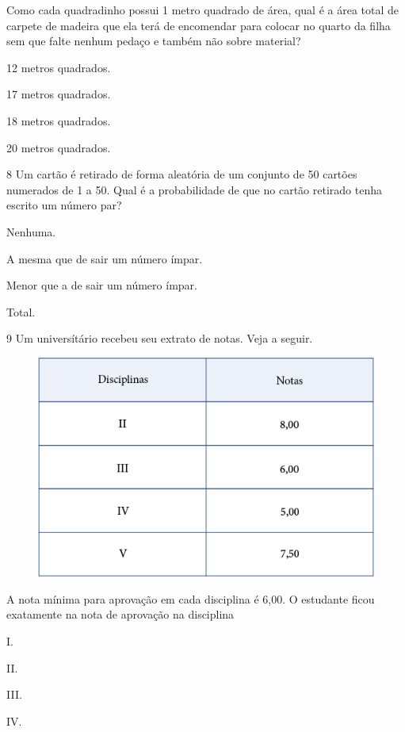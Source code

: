 Como cada quadradinho possui 1 metro quadrado de área, qual é a área total
de carpete de madeira que ela terá de encomendar para colocar no quarto
da filha sem que falte nenhum pedaço e também não sobre material?

\begin{escolha}
\item
  12 metros quadrados.
\item
  17 metros quadrados.
\item
  18 metros quadrados.
\item
  20 metros quadrados.
\end{escolha}


\num{8} Um cartão é retirado de forma aleatória de um conjunto de 50 cartões
numerados de 1 a 50. Qual é a probabilidade de que no cartão retirado
tenha escrito um número par?

\begin{escolha}
\item
  Nenhuma.
\item
  A mesma que de sair um número ímpar.
\item
  Menor que a de sair um número ímpar.
\item
  Total.
\end{escolha}


\num{9} Um universítário recebeu seu extrato de notas. Veja a seguir.

\begin{figure}[htpb!]
\centering
\includegraphics[width=.45\textwidth]{media/image85.png}
\end{figure}

A nota mínima para aprovação em cada disciplina é 6,00. O estudante ficou exatamente na nota de aprovação na disciplina

\begin{multicols}{2}
\begin{escolha}
\item
  I.
\item
  II.
\item
  III.
\item
  IV.
\end{escolha}
\end{multicols}

